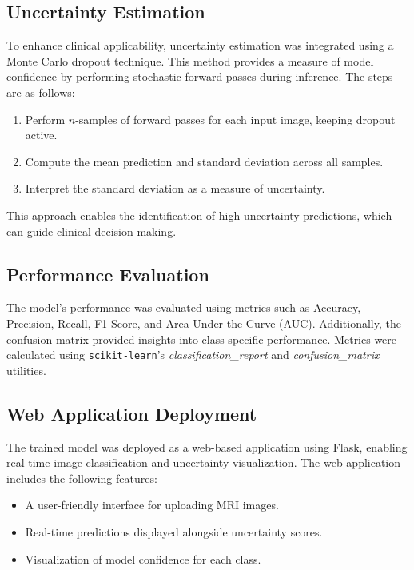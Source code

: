 \documentclass[12pt,onecolumn]{report}
\begin{document}
\subsection{Uncertainty Estimation}
To enhance clinical applicability, uncertainty estimation was integrated using a Monte Carlo dropout technique. This method provides a measure of model confidence by performing stochastic forward passes during inference. The steps are as follows:
\begin{enumerate}
    \item Perform \(n\)-samples of forward passes for each input image, keeping dropout active.
    \item Compute the mean prediction and standard deviation across all samples.
    \item Interpret the standard deviation as a measure of uncertainty.
\end{enumerate}
This approach enables the identification of high-uncertainty predictions, which can guide clinical decision-making.

\subsection{Performance Evaluation}
The model's performance was evaluated using metrics such as Accuracy, Precision, Recall, F1-Score, and Area Under the Curve (AUC). Additionally, the confusion matrix provided insights into class-specific performance. Metrics were calculated using \texttt{scikit-learn}'s \textit{classification\_report} and \textit{confusion\_matrix} utilities.

\subsection{Web Application Deployment}
The trained model was deployed as a web-based application using Flask, enabling real-time image classification and uncertainty visualization. The web application includes the following features:
\begin{itemize}
    \item A user-friendly interface for uploading MRI images.
    \item Real-time predictions displayed alongside uncertainty scores.
    \item Visualization of model confidence for each class.
\end{itemize}
\end{document}
